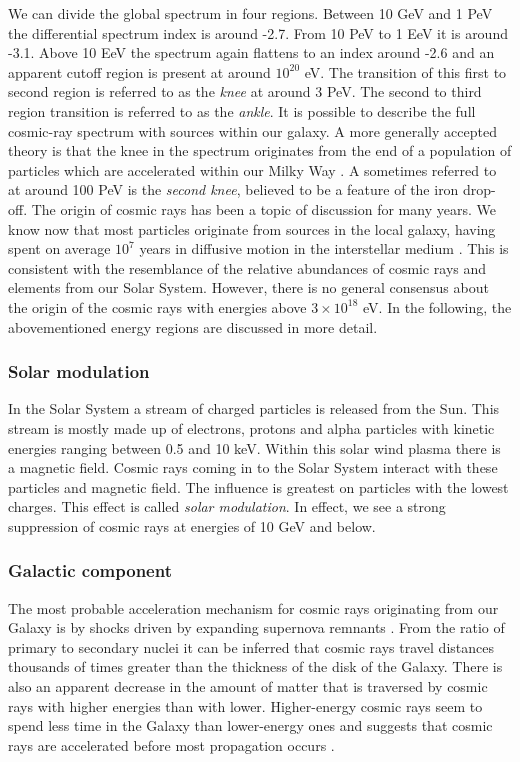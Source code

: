 We can divide the global spectrum in four regions. Between 10 GeV and 1 PeV the differential spectrum index is around -2.7. From 10 PeV to 1 EeV it is around -3.1. Above 10 EeV the spectrum again flattens to an index around -2.6 and an apparent cutoff region is present at around $10^{20}$ eV. The transition of this first to second region is referred to as the \textit{knee} at around 3 PeV. The second to third region transition is referred to as the \textit{ankle}. It is possible to describe the full cosmic-ray spectrum with sources within our galaxy. A more generally accepted theory is that the knee in the spectrum originates from the end of a population of particles which are accelerated within our Milky Way \cite{Gaisser:2013bla}. A sometimes referred to at around 100 PeV is the \textit{second knee}, believed to be a feature of the iron drop-off.
The origin of cosmic rays has been a topic of discussion for many years. We know now that most particles originate from sources in the local galaxy, having spent on average $10^7$ years in diffusive motion in the interstellar medium \cite{Gaisser:2013bla}. This is consistent with the resemblance of the relative abundances of cosmic rays and elements from our Solar System. However, there is no general consensus about the origin of the cosmic rays with energies above $3 \times 10^{18}$ eV. In the following, the abovementioned energy regions are discussed in more detail.

\subsubsection{Solar modulation}
In the Solar System a stream of charged particles is released from the Sun. This stream is mostly made up of electrons, protons and alpha particles with kinetic energies ranging between 0.5 and 10 keV. Within this solar wind plasma there is a magnetic field. Cosmic rays coming in to the Solar System interact with these particles and magnetic field. The influence is greatest on particles with the lowest charges. This effect is called \textit{solar modulation}. In effect, we see a strong suppression of cosmic rays at energies of 10 GeV and below.

\subsubsection{Galactic component}
The most probable acceleration mechanism for cosmic rays originating from our Galaxy is by shocks driven by expanding supernova remnants \cite{0034-4885-64-4-201}. From the ratio of primary to secondary nuclei it can be inferred that cosmic rays travel distances thousands of times greater than the thickness of the disk of the Galaxy. There is also an apparent decrease in the amount of matter that is traversed by cosmic rays with higher energies than with lower. Higher-energy cosmic rays seem to spend less time in the Galaxy than lower-energy ones and suggests that cosmic rays are accelerated before most propagation occurs \cite{Gaisser:2016uoy}.

